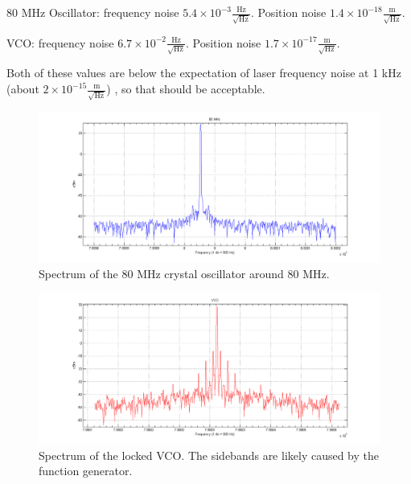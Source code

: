 80 MHz Oscillator: frequency noise $5.4\times 10^{-3} \frac{\mbox{Hz}}{\sqrt{\mbox{Hz}}}$.  Position noise $1.4\times 10^{-18} \frac{\mbox{m}}{\sqrt{\mbox{Hz}}}$.

VCO: frequency noise $6.7\times 10^{-2} \frac{\mbox{Hz}}{\sqrt{\mbox{Hz}}}$.  Position noise $1.7\times 10^{-17} \frac{\mbox{m}}{\sqrt{\mbox{Hz}}}$.

Both of these values are below the expectation of laser frequency noise at 1 kHz (about $2\times 10^{-15} \frac{\mbox{m}}{\sqrt{\mbox{Hz}}}$) , so that should be acceptable.



\begin{figure}[htp]
	\centering
		\includegraphics[width=\textwidth]{figures/controls/80.png}
	\caption[80 MHz oscillator spectrum]{Spectrum of the 80 MHz crystal oscillator around 80 MHz.}
	\label{fig:80}
\end{figure}

\begin{figure}[htp]
	\centering
		\includegraphics[width=\textwidth]{figures/controls/VCO.png}
	\caption[VCO spectrum]{Spectrum of the locked VCO. The sidebands are likely caused by the function generator.}
	\label{fig:VCO}
\end{figure}



